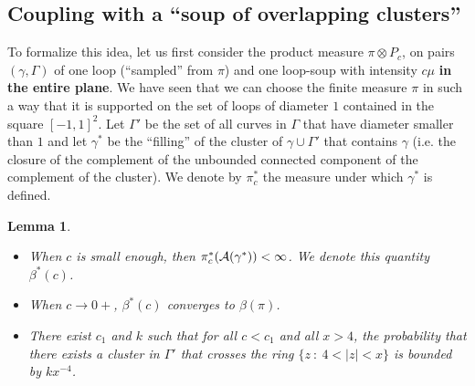 \documentclass[11pt]{article}
\newtheorem {lemma} [Theorem]    {Lemma}
\begin{document}
\subsection {Coupling with a ``soup of overlapping clusters''}

To formalize this idea, let us first
consider the product measure $\pi \otimes P_c$, on pairs $(\gamma, \Gamma)$
of one loop (``sampled'' from $\pi$)
and one loop-soup with intensity $c \mu$ {\bf in the entire plane}. 
We have seen that we can choose the finite  measure $\pi$ 
in such a way that it is supported on the set of loops of diameter $1$ 
contained in the square $[-1,1]^2$.
Let $\Gamma'$ be the set of all curves in $\Gamma$ that 
have diameter {smaller} than $1$ and let 
$\gamma^*$ be the ``filling'' of the cluster of $\gamma \cup \Gamma'$ that contains $\gamma$ (i.e. the closure of the complement of the unbounded connected component of the complement of the cluster). We denote by $\pi_c^*$ the measure under which 
$\gamma^*$ is defined. 



\begin {lemma}\label{15}
\begin {itemize}
\item
When $c$ is small enough, then $\pi_c^* ( {\cal A} ( \gamma^*) ) < \infty $. 
We denote this quantity $\beta^* (c) $.
\item When  ${c \to 0+}$,  $\beta^*(c)$ converges to  $\beta( \pi)$.
\item There exist $c_1$ and $k$ such that for all $c < c_1$ and all $x>4$, 
the probability that there exists a cluster in $\Gamma'$ that crosses the ring 
$ \{ z \ : \  4 < |z| < x\}$ is bounded by  $k x^{-4}$.
\end {itemize}
\end {lemma}
\end{document}
